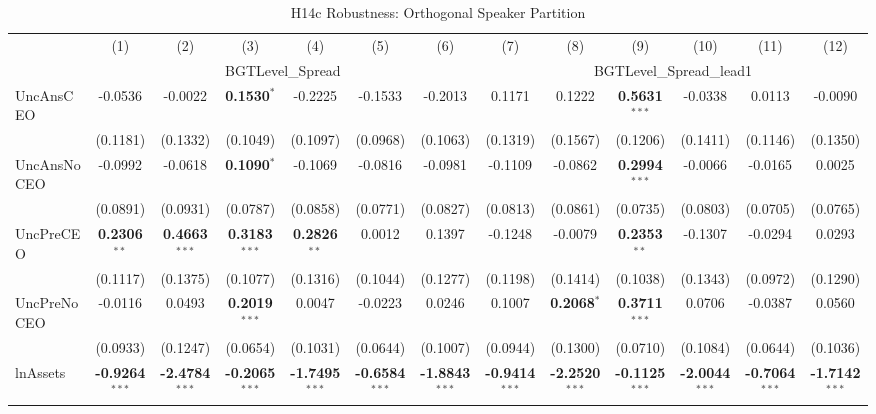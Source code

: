\begin{landscape}
\begin{table}[H]
\setlength{\tabcolsep}{3pt}
\renewcommand{\arraystretch}{0.85}
\centering
\caption{H14c Robustness: Orthogonal Speaker Partition}
\label{tab:h14c_robust}
\scriptsize
\begin{tabular}{lcccccccccccc}
\toprule
 & (1) & (2) & (3) & (4) & (5) & (6) & (7) & (8) & (9) & (10) & (11) & (12) \\
 & \multicolumn{6}{c}{BGTLevel\_Spread} & \multicolumn{6}{c}{BGTLevel\_Spread\_lead1} \\
\cmidrule(lr){2-7} \cmidrule(lr){8-13}
\midrule
UncAnsCEO & -0.0536 & -0.0022 & \textbf{0.1530}$^{*}$ & -0.2225 & -0.1533 & -0.2013 & 0.1171 & 0.1222 & \textbf{0.5631}$^{***}$ & -0.0338 & 0.0113 & -0.0090 \\
 & (0.1181) & (0.1332) & (0.1049) & (0.1097) & (0.0968) & (0.1063) & (0.1319) & (0.1567) & (0.1206) & (0.1411) & (0.1146) & (0.1350) \\
UncAnsNoCEO & -0.0992 & -0.0618 & \textbf{0.1090}$^{*}$ & -0.1069 & -0.0816 & -0.0981 & -0.1109 & -0.0862 & \textbf{0.2994}$^{***}$ & -0.0066 & -0.0165 & 0.0025 \\
 & (0.0891) & (0.0931) & (0.0787) & (0.0858) & (0.0771) & (0.0827) & (0.0813) & (0.0861) & (0.0735) & (0.0803) & (0.0705) & (0.0765) \\
UncPreCEO & \textbf{0.2306}$^{**}$ & \textbf{0.4663}$^{***}$ & \textbf{0.3183}$^{***}$ & \textbf{0.2826}$^{**}$ & 0.0012 & 0.1397 & -0.1248 & -0.0079 & \textbf{0.2353}$^{**}$ & -0.1307 & -0.0294 & 0.0293 \\
 & (0.1117) & (0.1375) & (0.1077) & (0.1316) & (0.1044) & (0.1277) & (0.1198) & (0.1414) & (0.1038) & (0.1343) & (0.0972) & (0.1290) \\
UncPreNoCEO & -0.0116 & 0.0493 & \textbf{0.2019}$^{***}$ & 0.0047 & -0.0223 & 0.0246 & 0.1007 & \textbf{0.2068}$^{*}$ & \textbf{0.3711}$^{***}$ & 0.0706 & -0.0387 & 0.0560 \\
 & (0.0933) & (0.1247) & (0.0654) & (0.1031) & (0.0644) & (0.1007) & (0.0944) & (0.1300) & (0.0710) & (0.1084) & (0.0644) & (0.1036) \\
\midrule
lnAssets & \textbf{-0.9264}$^{***}$ & \textbf{-2.4784}$^{***}$ & \textbf{-0.2065}$^{***}$ & \textbf{-1.7495}$^{***}$ & \textbf{-0.6584}$^{***}$ & \textbf{-1.8843}$^{***}$ & \textbf{-0.9414}$^{***}$ & \textbf{-2.2520}$^{***}$ & \textbf{-0.1125}$^{***}$ & \textbf{-2.0044}$^{***}$ & \textbf{-0.7064}$^{***}$ & \textbf{-1.7142}$^{***}$ \\

\end{tabular}
\end{table}
\end{landscape}
